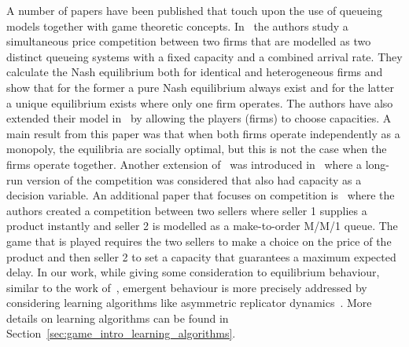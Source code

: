 A number of papers have been published that touch upon the use of 
queueing models together with game theoretic concepts.
In~\cite{FirmCompetition} the authors study a simultaneous price competition 
between two firms that are modelled as two distinct queueing systems with a 
fixed capacity and a combined arrival rate.
They calculate the Nash equilibrium both for identical and heterogeneous firms
and show that for the former a pure Nash equilibrium always exist and for the 
latter a unique equilibrium exists where only one firm operates.
The authors have also extended their model in~\cite{FirmCompetition2} by 
allowing the players (firms) to choose capacities. 
A main result from this paper was that when both firms operate independently as
a monopoly, the equilibria are socially optimal, but this is not the case when
the firms operate together.
Another extension of~\cite{FirmCompetition} was introduced 
in~\cite{FirmCompetitionExtension} where a long-run version of the competition 
was considered that also had capacity as a decision variable.
An additional paper that focuses on competition is~\cite{fan2009short} where
the authors created a competition between two sellers where seller 1 supplies 
a product instantly and seller 2 is modelled as a make-to-order M/M/1 queue.
The game that is played requires the two sellers to make a choice on the price 
of the product and then seller 2 to set a capacity that guarantees a maximum 
expected delay.
In our work, while giving some consideration to equilibrium behaviour,
similar to the work of~\cite{FirmCompetition, FirmCompetition2}, emergent
behaviour is more precisely addressed by considering learning algorithms like
asymmetric replicator dynamics~\cite{fudenberg1998theory}.
More details on learning algorithms can be found in
Section~\ref{sec:game_intro_learning_algorithms}.

